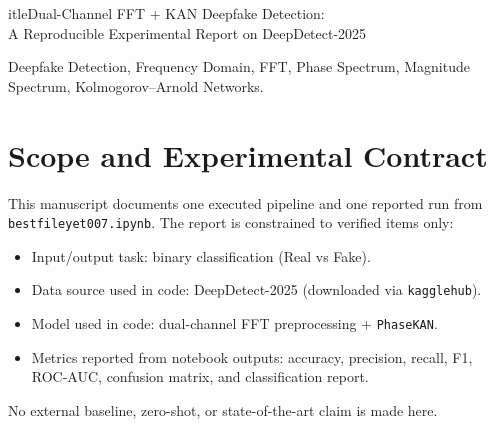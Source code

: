 \documentclass[conference]{IEEEtran}
\begin{document}
	itle{Dual-Channel FFT + KAN Deepfake Detection:\\
A Reproducible Experimental Report on DeepDetect-2025}

\author{
}

\maketitle

\begin{abstract}
This paper reports the exact experimental pipeline implemented in \texttt{bestfileyet007.ipynb} for binary deepfake detection (Real=0, Fake=1). The method converts grayscale spatial images to a dual-channel frequency representation and classifies samples with a convolutional stem followed by Kolmogorov--Arnold Network (KAN) layers. On a balanced DeepDetect-2025 subset of 103{,}986 images (51{,}993 real, 51{,}993 fake), with a deterministic 70/15/15 split, the run reports test loss 0.3683, accuracy 0.8324, precision 0.8222, recall 0.8483, F1-score 0.8351, and ROC-AUC 0.9172. This manuscript includes only formulas, settings, and outcomes directly present in the notebook implementation and outputs.
\end{abstract}

\begin{IEEEkeywords}
Deepfake Detection, Frequency Domain, FFT, Phase Spectrum, Magnitude Spectrum, Kolmogorov--Arnold Networks.
\end{IEEEkeywords}

\section{Scope and Experimental Contract}
This manuscript documents one executed pipeline and one reported run from \texttt{bestfileyet007.ipynb}. The report is constrained to verified items only:
\begin{itemize}
    \item Input/output task: binary classification (Real vs Fake).
    \item Data source used in code: DeepDetect-2025 (downloaded via \texttt{kagglehub}).
    \item Model used in code: dual-channel FFT preprocessing + \texttt{PhaseKAN}.
    \item Metrics reported from notebook outputs: accuracy, precision, recall, F1, ROC-AUC, confusion matrix, and classification report.
\end{itemize}
No external baseline, zero-shot, or state-of-the-art claim is made here.
\end{document}
